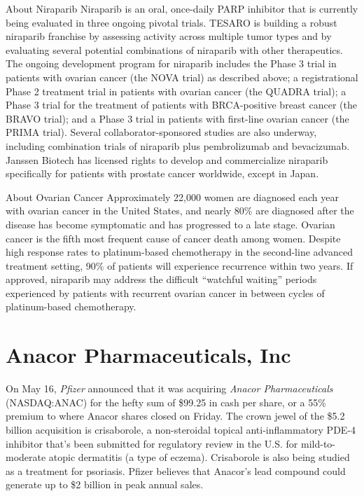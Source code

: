 \documentclass[letterpaper,12pt,english]{sphinxmanual}
\begin{document}
About Niraparib
Niraparib is an oral, once-daily PARP inhibitor that is currently being evaluated in three ongoing pivotal trials. TESARO is building a robust niraparib franchise by assessing activity across multiple tumor types and by evaluating several potential combinations of niraparib with other therapeutics. The ongoing development program for niraparib includes the Phase 3 trial in patients with ovarian cancer (the NOVA trial) as described above; a registrational Phase 2 treatment trial in patients with ovarian cancer (the QUADRA trial); a Phase 3 trial for the treatment of patients with BRCA-positive breast cancer (the BRAVO trial); and a Phase 3 trial in patients with first-line ovarian cancer (the PRIMA trial). Several collaborator-sponsored studies are also underway, including combination trials of niraparib plus pembrolizumab and bevacizumab. Janssen Biotech has licensed rights to develop and commercialize niraparib specifically for patients with prostate cancer worldwide, except in Japan.

About Ovarian Cancer
Approximately 22,000 women are diagnosed each year with ovarian cancer in the United States, and nearly 80\% are diagnosed after the disease has become symptomatic and has progressed to a late stage. Ovarian cancer is the fifth most frequent cause of cancer death among women. Despite high response rates to platinum-based chemotherapy in the second-line advanced treatment setting, 90\% of patients will experience recurrence within two years. If approved, niraparib may address the difficult ``watchful waiting'' periods experienced by patients with recurrent ovarian cancer in between cycles of platinum-based chemotherapy.


\chapter{Anacor Pharmaceuticals, Inc}
\label{chapters/chapter4:anacor}\label{chapters/chapter4::doc}\label{chapters/chapter4:anacor-pharmaceuticals-inc}
On May 16, \emph{Pfizer} announced that it was acquiring \emph{Anacor Pharmaceuticals} (NASDAQ:ANAC) for the hefty sum of \$99.25 in cash per share, or a 55\% premium to where Anacor shares closed on Friday. The crown jewel of the \$5.2 billion acquisition is crisaborole, a non-steroidal topical anti-inflammatory PDE-4 inhibitor that's been submitted for regulatory review in the U.S. for mild-to-moderate atopic dermatitis (a type of eczema). Crisaborole is also being studied as a treatment for psoriasis. Pfizer believes that Anacor's lead compound could generate up to \$2 billion in peak annual sales.
\end{document}
